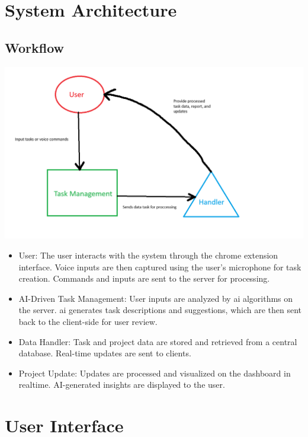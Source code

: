 \documentclass{article}
\begin{document}
\section{System Architecture}

\subsection{Workflow}

\includegraphics[width=0.9\linewidth]{./logo/workflow.png} 

\begin{itemize}
    \item User: The user interacts with the system through the chrome extension interface. Voice inputs are then captured using the user's microphone for task creation. Commands and inputs are sent to the server for processing.
    \item AI-Driven Task Management: User inputs are analyzed by \Gls{ai} algorithms on the server. \Gls{ai} generates task descriptions and suggestions, which are then sent back to the client-side for user review.
    \item Data Handler: Task and project data are stored and retrieved from a central database. Real-time updates are sent to clients.
    \item Project Update: Updates are processed and visualized on the dashboard in realtime. AI-generated insights are displayed to the user.
\end{itemize}

 
\section{User Interface}
\end{document}
